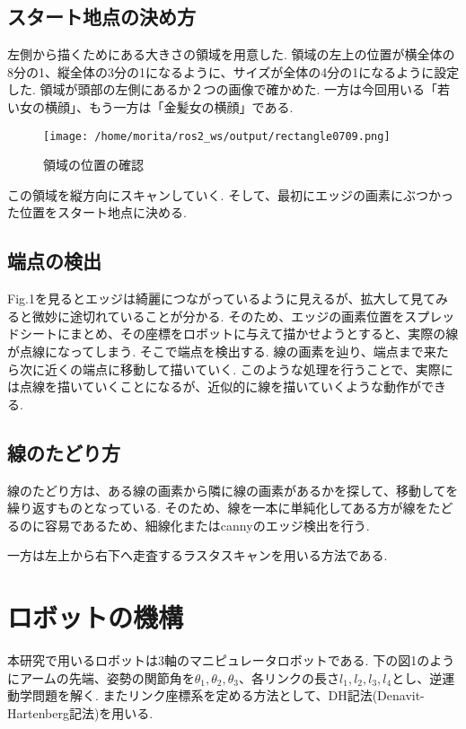 \documentclass[10pt]{jarticle}
\begin{document}
	\subsection{スタート地点の決め方}

	左側から描くためにある大きさの領域を用意した.
	領域の左上の位置が横全体の8分の1、縦全体の3分の1になるように、サイズが全体の4分の1になるように設定した.
	領域が頭部の左側にあるか２つの画像で確かめた.
	一方は今回用いる「若い女の横顔」、もう一方は「金髪女の横顔」である.


    \begin{center}
        \begin{figure}[h]
            \texttt{[image: /home/morita/ros2\_ws/output/rectangle0709.png]}
            \caption{領域の位置の確認}
            \label{the position of a region}
        \end{figure}
    \end{center}

	
	この領域を縦方向にスキャンしていく.
	そして、最初にエッジの画素にぶつかった位置をスタート地点に決める.
	

	\subsection{端点の検出}
	Fig.1を見るとエッジは綺麗につながっているように見えるが、拡大して見てみると微妙に途切れていることが分かる.
	そのため、エッジの画素位置をスプレッドシートにまとめ、その座標をロボットに与えて描かせようとすると、実際の線が点線になってしまう.
	そこで端点を検出する.
	線の画素を辿り、端点まで来たら次に近くの端点に移動して描いていく.
	このような処理を行うことで、実際には点線を描いていくことになるが、近似的に線を描いていくような動作ができる.
  \\ 

	\subsection{線のたどり方}

	線のたどり方は、ある線の画素から隣に線の画素があるかを探して、移動してを繰り返すものとなっている.
	そのため、線を一本に単純化してある方が線をたどるのに容易であるため、細線化またはcannyのエッジ検出を行う.

	一方は左上から右下へ走査するラスタスキャンを用いる方法である.


 	\section{ロボットの機構}
	本研究で用いるロボットは3軸のマニピュレータロボットである.
	下の図1のようにアームの先端、姿勢の関節角を$\theta_1, \theta_2, \theta_3$、各リンクの長さ$l_1, l_2, l_3, l_4$とし、逆運動学問題を解く.
	またリンク座標系を定める方法として、DH記法(Denavit-Hartenberg記法)を用いる.
\end{document}
